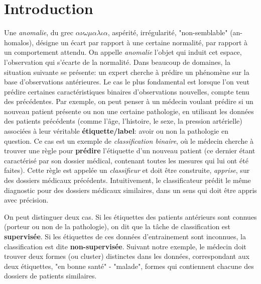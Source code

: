 \section{Introduction}
Une \emph{anomalie}, du grec $\alpha \nu \omega \mu \alpha \lambda \iota \alpha $, aspérité, irrégularité, "non-semblable" (an-homalos), désigne un écart par rapport à une certaine normalité, par rapport à un comportement attendu.
On appelle \emph {anomalie} l'objet qui induit cet espace, l'observation qui s'écarte de la normalité.
%
Dans beaucoup de domaines, la situation suivante se présente: un expert cherche à prédire un phénomène sur la base d'observations antérieures. Le cas le plus fondamental est lorsque l'on veut prédire certaines caractéristiques binaires d'observations nouvelles, compte tenu des précédentes. Par exemple, on peut penser à un médecin voulant prédire si un nouveau patient présente ou non une certaine pathologie, en utilisant les données des patients précédents (comme l'âge, l'histoire, le sexe, la pression artérielle) associées à leur véritable \textbf{étiquette/label}: avoir ou non la pathologie en question. Ce cas est un exemple de \emph {classification binaire}, où le médecin cherche à trouver une règle pour \textbf {prédire} l'étiquette d'un nouveau patient (ce dernier étant caractérisé par son dossier médical, contenant toutes les mesures qui lui ont été faites). Cette règle est appelée un \emph{classifieur} et doit être construite, \emph{apprise}, sur des dossiers médicaux précédents. %
Intuitivement, le classificateur prédit le même diagnostic pour des dossiers médicaux similaires, dans un sens qui doit être appris avec précision.

On peut distinguer deux cas. Si les étiquettes des patients antérieurs sont connues (porteur ou non de la pathologie), on dit que la tâche de classification est \textbf {supervisée}. Si les étiquettes de ces données d'entrainement sont inconnues, la classification est dite \textbf {non-supervisée}. Suivant notre exemple, le médecin doit trouver deux formes (ou cluster) distinctes dans les données, correspondant aux deux étiquettes, "en bonne santé" - "malade", formes qui contiennent chacune des dossiers de patients similaires.

